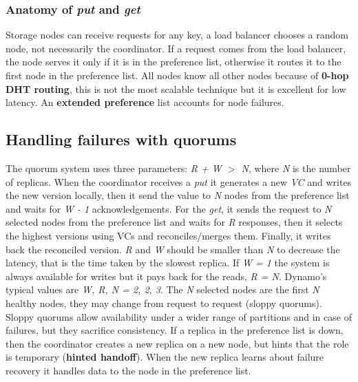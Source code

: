 		\subsubsection{Anatomy of \textit{put} and \textit{get}}
		Storage nodes can receive requests for any key, a load balancer chooses a random node, not necessarily the coordinator.\newline
		If a request comes from the load balancer, the node serves it only if it is in the preference list, otherwise it routes it to the first node in the preference list. All nodes know all other nodes because of \textbf{0-hop DHT routing}, this is not the most scalable technique but it is excellent for low latency.\newline
		An \textbf{extended preference} list accounts for node failures.
	\subsection{Handling failures with quorums}
	The quorum system uses three parameters: \textit{R + W $>$ N}, where \textit{N} is the number of replicas.\newline
	When the coordinator receives a \textit{put} it generates a new \textit{VC} and writes the new version locally, then it send the value to \textit{N} nodes from the preference list and waits for \textit{W - 1} acknowledgements.\newline
	For the \textit{get}, it sends the request to \textit{N} selected nodes from the preference list and waits for \textit{R} responses, then it selects the highest versions using VCs and reconciles/merges them. Finally, it writes back the reconciled version.\newline
	\newline
	\textit{R} and \textit{W} should be smaller than \textit{N} to decrease the latency, that is the time taken by the slowest replica. If \textit{W = 1} the system is always available for writes but it pays back for the reads, \textit{R = N}. Dynamo's typical values are \textit{W, R, N = 2, 2, 3}.\newline
	\newline
	The \textit{N} selected nodes are the first \textit{N} healthy nodes, they may change from request to request (sloppy quorums). Sloppy quorums allow availability under a wider range of partitions and in case of failures, but they sacrifice consistency.\newline
	If a replica in the preference list is down, then the coordinator creates a new replica on a new node, but hints that the role is temporary (\textbf{hinted handoff}). When the new replica learns about failure recovery it handles data to the node in the preference list.
